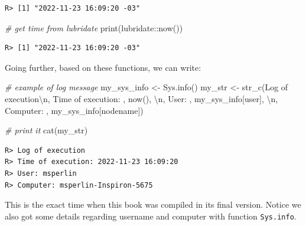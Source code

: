 \documentclass[
  12pt,
]{book}
\newenvironment{Shaded}{\begin{snugshade}}{\end{snugshade}}
\newcommand{\CommentTok}[1]{\textcolor[rgb]{0.37,0.37,0.37}{\textit{#1}}}
\newcommand{\FunctionTok}[1]{\textcolor[rgb]{0,0,0}{#1}}
\newcommand{\NormalTok}[1]{#1}
\newcommand{\OtherTok}[1]{\textcolor[rgb]{0.37,0.37,0.37}{#1}}
\newcommand{\SpecialCharTok}[1]{\textcolor[rgb]{0,0,0}{#1}}
\newcommand{\StringTok}[1]{\textcolor[rgb]{0.5,0.5,0.5}{#1}}
\begin{document}
\begin{verbatim}
R> [1] "2022-11-23 16:09:20 -03"
\end{verbatim}

\begin{Shaded}
\begin{Highlighting}[]
\CommentTok{\# get time from lubridate}
\FunctionTok{print}\NormalTok{(lubridate}\SpecialCharTok{::}\FunctionTok{now}\NormalTok{())}
\end{Highlighting}
\end{Shaded}

\begin{verbatim}
R> [1] "2022-11-23 16:09:20 -03"
\end{verbatim}

Going further, based on these functions, we can write:

\begin{Shaded}
\begin{Highlighting}[]
\CommentTok{\# example of log message}
\NormalTok{my\_sys\_info }\OtherTok{\textless{}{-}} \FunctionTok{Sys.info}\NormalTok{()}
\NormalTok{my\_str }\OtherTok{\textless{}{-}} \FunctionTok{str\_c}\NormalTok{(}\StringTok{\textquotesingle{}Log of execution}\SpecialCharTok{\textbackslash{}n}\StringTok{\textquotesingle{}}\NormalTok{,}
                \StringTok{\textquotesingle{}Time of execution: \textquotesingle{}}\NormalTok{, }\FunctionTok{now}\NormalTok{(), }\StringTok{\textquotesingle{}}\SpecialCharTok{\textbackslash{}n}\StringTok{\textquotesingle{}}\NormalTok{,}
                \StringTok{\textquotesingle{}User: \textquotesingle{}}\NormalTok{, my\_sys\_info[}\StringTok{\textquotesingle{}user\textquotesingle{}}\NormalTok{], }\StringTok{\textquotesingle{}}\SpecialCharTok{\textbackslash{}n}\StringTok{\textquotesingle{}}\NormalTok{,}
                \StringTok{\textquotesingle{}Computer: \textquotesingle{}}\NormalTok{, my\_sys\_info[}\StringTok{\textquotesingle{}nodename\textquotesingle{}}\NormalTok{])}

\CommentTok{\# print it}
\FunctionTok{cat}\NormalTok{(my\_str)}
\end{Highlighting}
\end{Shaded}

\begin{verbatim}
R> Log of execution
R> Time of execution: 2022-11-23 16:09:20
R> User: msperlin
R> Computer: msperlin-Inspiron-5675
\end{verbatim}

This is the exact time when this book was compiled in its final version. Notice we also got some details regarding username and computer with function \texttt{Sys.info}.
\end{document}
